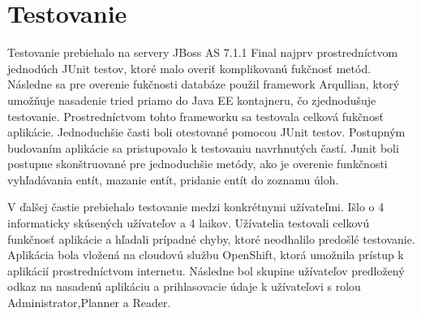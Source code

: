 	



 
\section{Testovanie}
Testovanie prebiehalo na servery JBoss AS 7.1.1 Final najprv prostredníctvom jednodúch JUnit testov, ktoré malo overiť komplikovanú fukčnosť metód. Následne sa pre overenie fukčnosti databáze použil framework Arqullian, ktorý umožňuje nasadenie tried priamo do Java EE kontajneru, čo zjednodušuje testovanie. Prostredníctvom tohto frameworku sa testovala celková fukčnosť aplikácie. Jednoduchšie časti boli otestované pomocou JUnit testov. Postupným budovaním aplikácie sa pristupovalo k testovaniu navrhnutých častí. Junit boli postupne skonštruované pre jednoduchšie metódy, ako je overenie funkčnosti vyhľadávania entít, mazanie entít, pridanie entít do zoznamu úloh. 


V ďalšej častie prebiehalo testovanie medzi konkrétnymi užívateľmi. Išlo o 4 informaticky skúsených užívateľov a 4 laikov.  Užívatelia testovali celkovú funkčnosť aplikácie a hľadali prípadné chyby, ktoré neodhalilo predošlé testovanie. Aplikácia bola vložená na cloudovú službu OpenShift, ktorá umožnila prístup k aplikácií prostredníctvom internetu. Následne bol skupine užívateľov predložený odkaz na nasadenú aplikáciu a prihlasovacie údaje k užívateľovi s rolou Administrator,Planner a Reader. 

